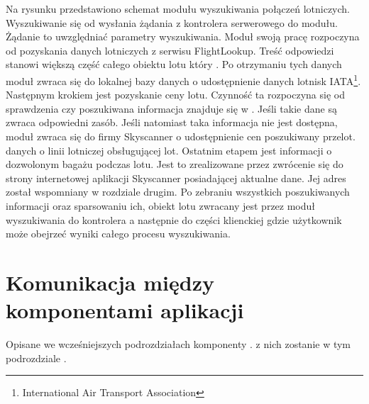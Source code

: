 \documentclass[12pt, twoside]{report}
\begin{document}
Na rysunku   przedstawiono schemat  modułu wyszukiwania połączeń lotniczych.    Wyszukiwanie  się od wysłania żądania z kontrolera serwerowego do  modułu. Żądanie to  uwzględniać  parametry wyszukiwania. Moduł swoją pracę rozpoczyna od pozyskania danych lotniczych z serwisu FlightLookup. Treść odpowiedzi stanowi większą część całego obiektu lotu który . Po otrzymaniu tych danych moduł zwraca się do lokalnej bazy danych o udostępnienie danych lotnisk  IATA\footnote{International Air Transport Association}. Następnym krokiem jest pozyskanie ceny lotu. Czynność ta rozpoczyna się od sprawdzenia\add{,} czy poszukiwana informacja  znajduje się w . Jeśli takie dane są   zwraca odpowiedni zasób. Jeśli natomiast taka informacja nie jest dostępna, moduł zwraca się do  firmy Skyscanner o udostępnienie cen  poszukiwany przelot.  danych o linii lotniczej obsługującej lot. Ostatnim etapem  jest  informacji o dozwolonym bagażu podczas lotu. Jest to zrealizowane przez zwrócenie się do strony internetowej aplikacji Skyscanner posiadającej aktualne dane. Jej adres został wspomniany w rozdziale drugim. Po zebraniu wszystkich poszukiwanych informacji oraz sparsowaniu ich, obiekt lotu zwracany jest przez moduł wyszukiwania do kontrolera a następnie do części klienckiej gdzie użytkownik może obejrzeć wyniki całego procesu wyszukiwania.

\section{Komunikacja między komponentami aplikacji}
Opisane we wcześniejszych podrozdziałach komponenty .  z nich zostanie  w tym podrozdziale . 
\end{document}
